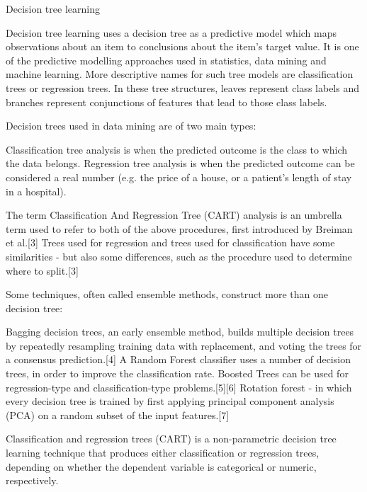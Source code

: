 Decision tree learning

Decision tree learning uses a decision tree as a predictive model which maps observations about an item to conclusions about the item's target value. It is one of the predictive modelling approaches used in statistics, data mining and machine learning. More descriptive names for such tree models are classification trees or regression trees. In these tree structures, leaves represent class labels 
and branches represent conjunctions of features that lead to those class labels.


Decision trees used in data mining are of two main types:

Classification tree analysis is when the predicted outcome is the class to which the data belongs.
Regression tree analysis is when the predicted outcome can be considered a real number (e.g. the price of a house, or a patient’s length of stay in a hospital).


The term Classification And Regression Tree (CART) analysis is an umbrella term used to refer to both of the above procedures, first introduced by Breiman et al.[3] Trees used for regression and trees used for classification have some similarities - but also some differences, such as the procedure used to determine where to split.[3]

Some techniques, often called ensemble methods, construct more than one decision tree:

Bagging decision trees, an early ensemble method, builds multiple decision trees by repeatedly resampling training data with replacement, and voting the trees for a consensus prediction.[4]
A Random Forest classifier uses a number of decision trees, in order to improve the classification rate.
Boosted Trees can be used for regression-type and classification-type problems.[5][6]
Rotation forest - in which every decision tree is trained by first applying principal component analysis (PCA) on a random subset of the input features.[7]


Classification and regression trees (CART) is a non-parametric decision tree learning technique that produces either classification or regression trees, depending on whether the dependent variable is categorical or numeric, respectively.

